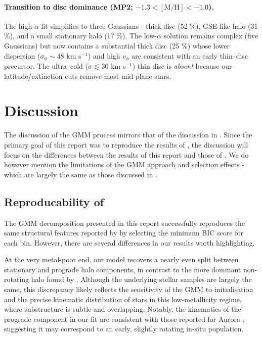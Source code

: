 \documentclass[a4paper,12pt]{article}
\begin{document}
\paragraph{Transition to disc dominance (MP2; $-1.3<[\mathrm{M/H}]<-1.0$).}
The high-$\alpha$ fit simplifies to three Gaussians—thick disc (52 \%),
GSE-like halo (31 \%), and a small stationary halo (17 \%).
The low-$\alpha$ solution remains complex (five Gaussians) but now
contains a substantial thick disc (25 \%) whose lower dispersion
($\sigma_{\phi}\!\sim\!48$ km s$^{-1}$) and high $v_{\phi}$ are
consistent with an early thin–disc precursor.
The ultra–cold ($\sigma\!\lesssim\!30$ km s$^{-1}$) thin disc is
\emph{absent} because our latitude/extinction cuts remove most
mid-plane stars.

  






\section{Discussion} \label{sec:discussion}

The discussion of the GMM process mirrors that of the discussion in \citet{zhang2024existencemetalpoordiscmilky}.
Since the primary goal of this report was to reproduce the results of \citet{zhang2024existencemetalpoordiscmilky},
the discussion will focus on the differences between the results of this report and those of \citet{zhang2024existencemetalpoordiscmilky}.
We do however mention the limitations of the GMM approach and selection effects - which are largely 
the same as those discussed in \citet{zhang2024existencemetalpoordiscmilky}.

\subsection{\texorpdfstring{Reproducability of \citet{zhang2024existencemetalpoordiscmilky}}{Reproducability of Zhang et al.\ (2024)}}


The GMM decomposition presented in this report successfully reproduces the same structural features reported 
by \citet{zhang2024existencemetalpoordiscmilky} by selecting the minimum BIC score for each bin. However, there 
are several differences in our results worth highlighting.

At the very metal-poor end, our model recovers a nearly even split between stationary and prograde halo 
components, in contrast to the more dominant non-rotating halo found by \citet{zhang2024existencemetalpoordiscmilky}. 
Although the underlying stellar samples are largely the same, this discrepancy likely reflects the 
sensitivity of the GMM to initialisation and the precise kinematic distribution of stars in this 
low-metallicity regime, where substructure is subtle and overlapping. Notably, the kinematics of the 
prograde component in our fit are consistent with those reported for Aurora \citep{Belokurov2022}, 
suggesting it may correspond to an early, slightly rotating in-situ population.
\end{document}
